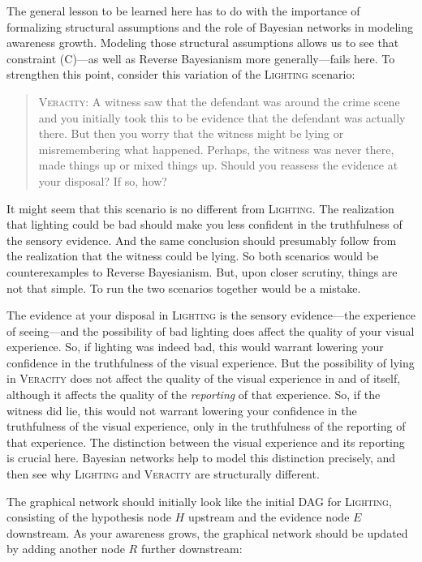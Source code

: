 \documentclass[
  11pt,
  dvipsnames,enabledeprecatedfontcommands]{scrartcl}
\begin{document}
The general lesson to be learned here has to do with the importance of
formalizing structural assumptions and the role of Bayesian networks in
modeling awareness growth. Modeling those structural assumptions allows
us to see that constraint (C)---as well as Reverse Bayesianism more
generally---fails here. To strengthen this point, consider this
variation of the \textsc{Lighting} scenario:

\begin{quote}
\textsc{Veracity}: A witness saw that the defendant was around the crime
scene and you initially took this to be evidence that the defendant was
actually there. But then you worry that the witness might be lying or
misremembering what happened. Perhaps, the witness was never there, made
things up or mixed things up. Should you reassess the evidence at your
disposal? If so, how?
\end{quote}

\doublespace

\noindent   It might seem that this scenario is no different from
\textsc{Lighting}. The realization that lighting could be bad should
make you less confident in the truthfulness of the sensory evidence. And
the same conclusion should presumably follow from the realization that
the witness could be lying. So both scenarios would be counterexamples
to Reverse Bayesianism. But, upon closer scrutiny, things are not that
simple. To run the two scenarios together would be a mistake.

The evidence at your disposal in \textsc{Lighting} is the sensory
evidence---the experience of seeing---and the possibility of bad
lighting does affect the quality of your visual experience. So, if
lighting was indeed bad, this would warrant lowering your confidence in
the truthfulness of the visual experience. But the possibility of lying
in \textsc{Veracity} does not affect the quality of the visual
experience in and of itself, although it affects the quality of the
\textit{reporting} of that experience. So, if the witness did lie, this
would not warrant lowering your confidence in the truthfulness of the
visual experience, only in the truthfulness of the reporting of that
experience. The distinction between the visual experience and its
reporting is crucial here. Bayesian networks help to model this
distinction precisely, and then see why \textsc{Lighting} and
\textsc{Veracity} are structurally different.

The graphical network should initially look like the initial DAG for
\textsc{Lighting}, consisting of the hypothesis node \(H\) upstream and
the evidence node \(E\) downstream. As your awareness grows, the
graphical network should be updated by adding another node \(R\) further
downstream:
\end{document}
